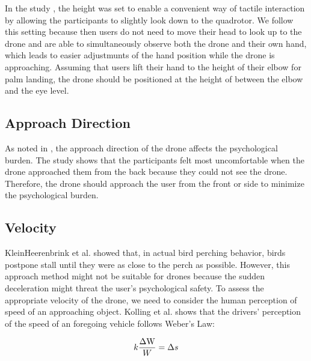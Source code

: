 In the study \cite{lieser2021evaluating-distances}, the height was set to enable a convenient way of tactile interaction 
by allowing the participants to slightly look down to the quadrotor.
We follow this setting because then users do not need to move their head to look up to the drone and are able to simultaneously observe both the drone and their own hand, 
which leads to easier adjustmunts of the hand position while the drone is approaching.
Assuming that users lift their hand to the height of their elbow for palm landing, the drone should be positioned at the height of between the elbow and the eye level.

\subsection{Approach Direction}

As noted in \cite{lieser2021evaluating-distances}, the approach direction of the drone affects the psychological burden.
The study shows that the participants felt most uncomfortable when the drone approached them from the back because they could not see the drone.
Therefore, the drone should approach the user from the front or side to minimize the psychological burden.


\subsection{Velocity}

KleinHeerenbrink et al. \cite{kleinheerenbrink2022optimization} showed that, in actual bird perching behavior, birds postpone stall until they were as close to the perch as possible.
However, this approach method might not be suitable for drones because the sudden deceleration might threat the user's psychological safety.
To assess the appropriate velocity of the drone, we need to consider the human perception of speed of an approaching object.
Kolling et al. \cite{Kolling2012weber-fechner-law} shows that the drivers' perception of the speed of an foregoing vehicle follows Weber's Law:

\begin{equation}
    k{\frac{\Delta {\rm W}}{W}}=\Delta s
\end{equation}

